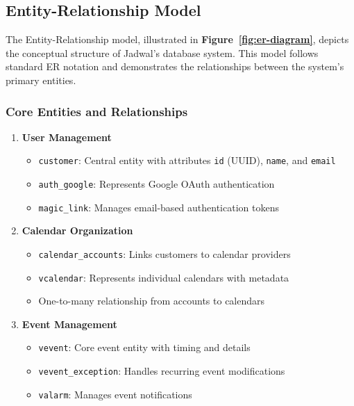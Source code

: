 \documentclass[12pt,a4paper,twoside]{report}
\begin{document}
\subsection{Entity-Relationship Model}

The Entity-Relationship model, illustrated in \textbf{Figure~\ref{fig:er-diagram}}, depicts the conceptual structure of Jadwal's database system. This model follows standard ER notation and demonstrates the relationships between the system's primary entities.

\subsubsection{Core Entities and Relationships}

\begin{enumerate}
    \item \textbf{User Management}
          \begin{itemize}
              \item \texttt{customer}: Central entity with attributes \texttt{id} (UUID), \texttt{name}, and \texttt{email}
              \item \texttt{auth\_google}: Represents Google OAuth authentication
              \item \texttt{magic\_link}: Manages email-based authentication tokens
          \end{itemize}

    \item \textbf{Calendar Organization}
          \begin{itemize}
              \item \texttt{calendar\_accounts}: Links customers to calendar providers
              \item \texttt{vcalendar}: Represents individual calendars with metadata
              \item One-to-many relationship from accounts to calendars
          \end{itemize}

    \item \textbf{Event Management}
          \begin{itemize}
              \item \texttt{vevent}: Core event entity with timing and details
              \item \texttt{vevent\_exception}: Handles recurring event modifications
              \item \texttt{valarm}: Manages event notifications
          \end{itemize}
\end{enumerate}
\end{document}
